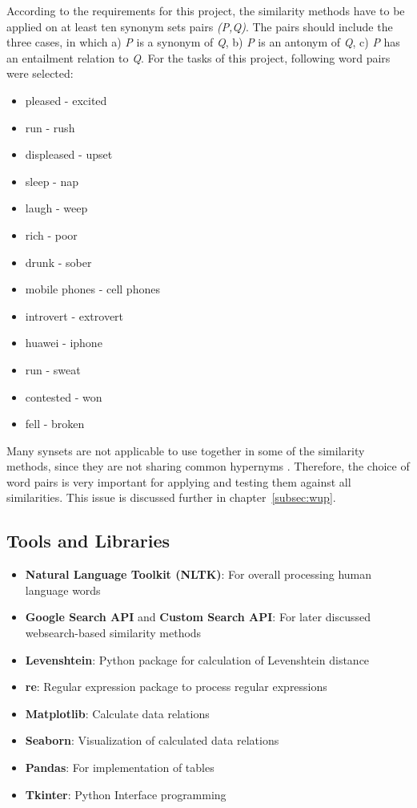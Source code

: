 \documentclass[conference]{IEEEtran}
\begin{document}
According to the requirements for this project, the similarity methods have to be applied on at least ten synonym sets pairs \textit{(P,Q)}. The pairs should include the three cases, in which a) \textit{P} is a synonym of \textit{Q}, b) \textit{P} is an antonym of \textit{Q}, c) \textit{P} has an entailment relation to \textit{Q}. For the tasks of this project, following word pairs were selected:
\begin{itemize}
\item pleased - excited
\item run - rush
\item displeased - upset
\item sleep - nap
\item laugh - weep
\item rich - poor
\item drunk - sober
\item mobile phones - cell phones
\item introvert - extrovert
\item huawei - iphone
\item run - sweat
\item contested - won
\item fell - broken
\end{itemize}
Many synsets are not applicable to use together in some of the similarity methods, since they are not sharing common hypernyms \cite{perkins}. Therefore, the choice of word pairs is very important for applying and testing them against all similarities. This issue is discussed further in chapter~\ref{subsec:wup}.

\subsection{Tools and Libraries}
\begin{itemize}
\item \textbf{Natural Language Toolkit (NLTK)}: For overall processing human language words
\item \textbf{Google Search API} and \textbf{Custom Search API}: For later discussed websearch-based similarity methods
\item \textbf{Levenshtein}: Python package for calculation of Levenshtein distance
\item \textbf{re}: Regular expression package to process regular expressions
\item \textbf{Matplotlib}: Calculate data relations
\item \textbf{Seaborn}: Visualization of calculated data relations
\item \textbf{Pandas}: For implementation of tables
\item \textbf{Tkinter}: Python Interface programming
\end{itemize}
\end{document}
